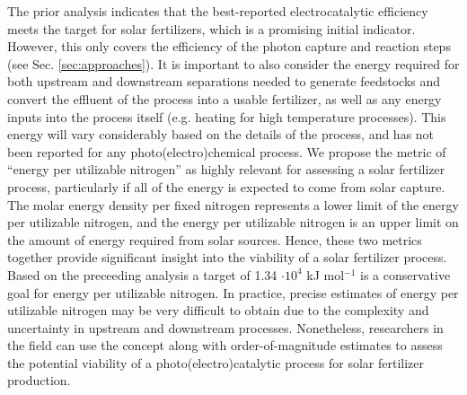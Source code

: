 The prior analysis indicates that the best-reported electrocatalytic efficiency meets the target for solar fertilizers, which is a promising initial indicator. However, this only covers the efficiency of the photon capture and reaction steps (see Sec. \ref{sec:approaches}). It is important to also consider the energy required for both upstream and downstream separations needed to generate feedstocks and convert the effluent of the process into a usable fertilizer, as well as any energy inputs into the process itself (e.g. heating for high temperature processes). This energy will vary considerably based on the details of the process, and has not been reported for any photo(electro)chemical process. We propose the metric of ``energy per utilizable nitrogen'' as highly relevant for assessing a solar fertilizer process, particularly if all of the energy is expected to come from solar capture. The molar energy density per fixed nitrogen represents a lower limit of the energy per utilizable nitrogen, and the energy per utilizable nitrogen is an upper limit on the amount of energy required from solar sources. Hence, these two metrics together provide significant insight into the viability of a solar fertilizer process. Based on the preceeding analysis a target of 1.34 $\cdot 10^4$ kJ mol$^{-1}$ is a conservative goal for energy per utilizable nitrogen. In practice, precise estimates of energy per utilizable nitrogen may be very difficult to obtain due to the complexity and uncertainty in upstream and downstream processes. Nonetheless, researchers in the field can use the concept along with order-of-magnitude estimates to assess the potential viability of a photo(electro)catalytic process for solar fertilizer production.



